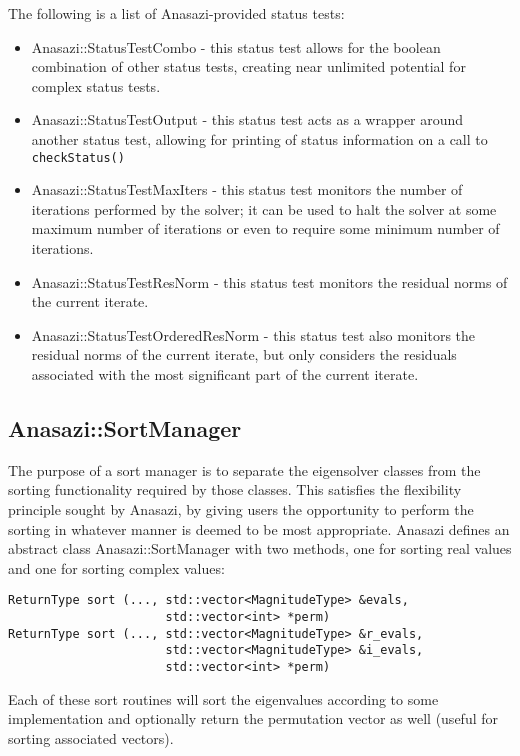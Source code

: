 The following is a list of Anasazi-provided status tests:
\begin{itemize}
  \item Anasazi::StatusTestCombo - this status test allows for the boolean combination of
    other status tests, creating near unlimited potential for complex status tests.
  \item Anasazi::StatusTestOutput - this status test acts as a wrapper around another
    status test, allowing for printing of status information on a call to
    \verb!checkStatus()!
  \item Anasazi::StatusTestMaxIters - this status test monitors the number of iterations
    performed by the solver; it can be used to halt the solver at some maximum number of iterations
    or even to require some minimum number of iterations.
  \item Anasazi::StatusTestResNorm - this status test monitors the residual norms of the
    current iterate.
  \item Anasazi::StatusTestOrderedResNorm - this status test also monitors the residual
    norms of the current iterate, but only considers the residuals associated with the
    most significant part of the current iterate.
\end{itemize}

\subsection{Anasazi::SortManager}
\label{sec:anasazi:sorter}

The purpose of a sort manager is to separate the eigensolver classes from the
sorting functionality required by those classes. This satisfies the flexibility
principle sought by Anasazi, by giving users the opportunity to perform the
sorting in whatever manner is deemed to be most appropriate. Anasazi defines an
abstract class Anasazi::SortManager with two methods, one for sorting real
values and one for sorting complex values:
\begin{verbatim}
ReturnType sort (..., std::vector<MagnitudeType> &evals, 
                      std::vector<int> *perm) 
ReturnType sort (..., std::vector<MagnitudeType> &r_evals, 
                      std::vector<MagnitudeType> &i_evals, 
                      std::vector<int> *perm)
\end{verbatim}
Each of these sort routines will sort the eigenvalues according to some
implementation and optionally return the permutation vector as well (useful for
sorting associated vectors). 

